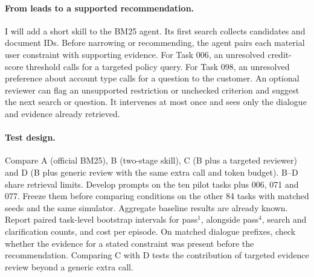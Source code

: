 \documentclass{article}
\begin{document}
\paragraph{From leads to a supported recommendation.} I will add a short skill to the BM25 agent. Its first search collects candidates and document IDs. Before narrowing or recommending, the agent pairs each material user constraint with supporting evidence. For Task 006, an unresolved credit-score threshold calls for a targeted policy query. For Task 098, an unresolved preference about account type calls for a question to the customer. An optional reviewer can flag an unsupported restriction or unchecked criterion and suggest the next search or question. It intervenes at most once and sees only the dialogue and evidence already retrieved.

\paragraph{Test design.} Compare A (official BM25), B (two-stage skill), C (B plus a targeted reviewer) and D (B plus generic review with the same extra call and token budget). B--D share retrieval limits. Develop prompts on the ten pilot tasks plus 006, 071 and 077. Freeze them before comparing conditions on the other 84 tasks with matched seeds and the same simulator. Aggregate baseline results are already known. Report paired task-level bootstrap intervals for pass$^1$, alongside pass$^4$, search and clarification counts, and cost per episode. On matched dialogue prefixes, check whether the evidence for a stated constraint was present before the recommendation. Comparing C with D tests the contribution of targeted evidence review beyond a generic extra call.
\end{document}
